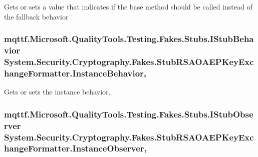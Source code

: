 Gets or sets a value that indicates if the base method should be called instead of the fallback behavior

\hypertarget{class_system_1_1_security_1_1_cryptography_1_1_fakes_1_1_stub_r_s_a_o_a_e_p_key_exchange_formatter_af13cf04712bb2fcaa1d2a27a106106af}{
\subsubsection[{Instance\-Behavior}]{\setlength{\rightskip}{0pt plus 5cm}mqttf.\-Microsoft.\-Quality\-Tools.\-Testing.\-Fakes.\-Stubs.\-I\-Stub\-Behavior System.\-Security.\-Cryptography.\-Fakes.\-Stub\-R\-S\-A\-O\-A\-E\-P\-Key\-Exchange\-Formatter.\-Instance\-Behavior\hspace{0.3cm}{\ttfamily [get]}, {\ttfamily [set]}}}\label{class_system_1_1_security_1_1_cryptography_1_1_fakes_1_1_stub_r_s_a_o_a_e_p_key_exchange_formatter_af13cf04712bb2fcaa1d2a27a106106af}


Gets or sets the instance behavior.

\hypertarget{class_system_1_1_security_1_1_cryptography_1_1_fakes_1_1_stub_r_s_a_o_a_e_p_key_exchange_formatter_aee00c49e4246b52669e1e9bc94a8545b}{
\subsubsection[{Instance\-Observer}]{\setlength{\rightskip}{0pt plus 5cm}mqttf.\-Microsoft.\-Quality\-Tools.\-Testing.\-Fakes.\-Stubs.\-I\-Stub\-Observer System.\-Security.\-Cryptography.\-Fakes.\-Stub\-R\-S\-A\-O\-A\-E\-P\-Key\-Exchange\-Formatter.\-Instance\-Observer\hspace{0.3cm}{\ttfamily [get]}, {\ttfamily [set]}}}\label{class_system_1_1_security_1_1_cryptography_1_1_fakes_1_1_stub_r_s_a_o_a_e_p_key_exchange_formatter_aee00c49e4246b52669e1e9bc94a8545b}


